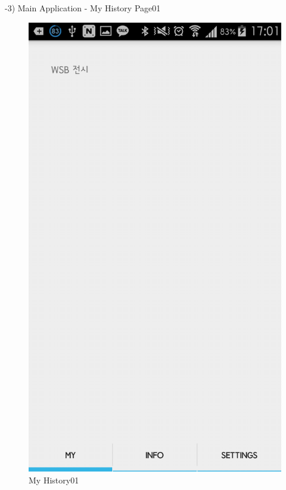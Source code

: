 \documentclass[conference]{IEEEtran}
\begin{document}
-3) Main Application - My History Page01\\
\begin{figure}[htbp]
\begin{center}
    \includegraphics[scale=0.2]{img_capture04}
    \caption{My History01} 
\end{center}
\end{figure}\\
\end{document}
